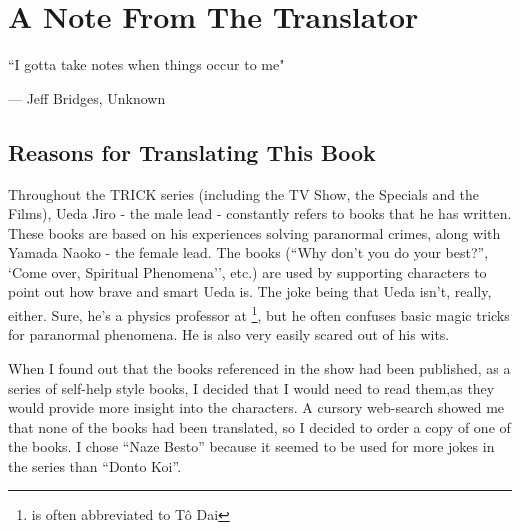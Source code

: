 

\chapter*{A Note From The Translator}

\epigraph{``I gotta take notes when things occur to me"}{--- \textup{Jeff Bridges}, Unknown}

\section*{Reasons for Translating This Book}

Throughout the TRICK series (including the TV Show, the Specials and the Films), Ueda Jiro - the male lead - constantly refers to books that he has written. These books are based on his experiences solving paranormal crimes, along with Yamada Naoko - the female lead. The books (``Why don't you do your best?'', `Come over, Spiritual Phenomena'', etc.) are used by supporting characters to point out how brave and smart Ueda is. The joke being that Ueda isn't, really, either. Sure, he's a physics professor at \footnote{ is often abbreviated to T\^{o} Dai}, but he often confuses basic magic tricks for paranormal phenomena. He is also very easily scared out of his wits.

\par When I found out that the books referenced in the show had been published, as a series of self-help style books, I decided that I would need to read them,as they would provide more insight into the characters. A cursory web-search showed me that none of the books had been translated, so I decided to order a copy of one of the books. I chose ``Naze Besto'' because it seemed to be used for more jokes in the series than ``Donto Koi''.


